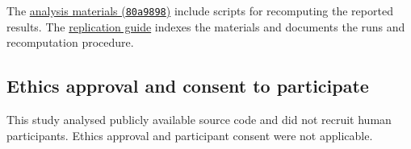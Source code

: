 \documentclass[smallextended,natbib]{../template/svjour3}
\begin{document}
The \href{https://github.com/kristoisberg/thesis-paper/tree/80a9898da632ee43e81cc9404365f9f5f21c3bb1/analysis}{analysis materials (\texttt{80a9898})} include scripts for recomputing the reported results. The \href{https://github.com/kristoisberg/thesis-paper/blob/80a9898da632ee43e81cc9404365f9f5f21c3bb1/analysis/README.md}{replication guide} indexes the materials and documents the runs and recomputation procedure.

\subsection*{Ethics approval and consent to participate}
This study analysed publicly available source code and did not recruit human participants. Ethics approval and participant consent were not applicable.



\end{document}

